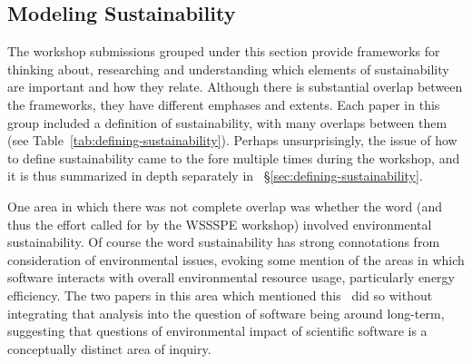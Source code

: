 \documentclass[11pt, oneside]{amsart}
\begin{document}
\subsection{Modeling Sustainability}

The workshop submissions grouped under this section provide frameworks
for thinking about, researching and understanding which elements of sustainability
are important and how they relate. Although there is substantial
overlap between the frameworks, they have different emphases and
extents.  Each paper in this group included a definition of sustainability,
with many overlaps between them  (see Table~\ref{tab:defining-sustainability}).
Perhaps unsurprisingly, the issue of how to define sustainability came
to the fore multiple times during the workshop, and it is thus
summarized in depth separately in ~\S\ref{sec:defining-sustainability}.

One area in which there was not complete overlap was whether the word
(and thus the effort called for by the WSSSPE workshop) involved
environmental sustainability. Of course the word sustainability has
strong connotations from consideration of environmental issues,
evoking some mention of the areas in which software interacts with
overall environmental resource usage, particularly energy efficiency.
The two papers in this area which mentioned this~\cite{Venters_WSSSPE,Calero_WSSSPE} did so without
integrating that analysis into the question of software being around
long-term, suggesting that questions of environmental impact of
scientific software is a conceptually distinct area of inquiry.
\end{document}
